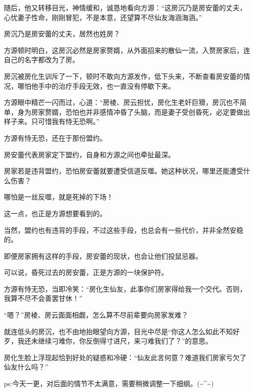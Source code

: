 \begin{this_body}
随后，他又转移目光，神情缓和，诚恳地看向方源：“这房沉乃是房安蕾的丈夫，心忧妻子性命，刚刚冒犯，不是本意，还望算不尽仙友海涵海涵。”

房沉乃是房安蕾的丈夫，居然也姓房？

方源顿时明白，这房沉必然是房家赘婿，从外面招来的散仙一流，入赘房家后，连自己的名字都改为了房。

房沉被房化生训斥了一下，顿时不敢向方源发作，低下头来，不断查看房安蕾的情况，哪怕他手中的治疗手段无效，也一直没有停歇下来。

方源眼中精芒一闪而过，心道：“房棱、房云担忧，房化生老奸巨猾，房沉也不简单，身为房家赘婿，恐怕也并非感情冲昏了头脑，而是妻子受创昏死，必定要做出样子来。只可惜我有恃无恐啊。”

方源有恃无恐，还在于那份盟约。

房安蕾代表房家定下盟约，自身和方源之间也牵扯最深。

房家若是违背盟约，恐怕房安蕾就要遭受信道反噬。她这种状况，哪里还能遭受什么伤害？

哪怕是一丝反噬，就是死掉的下场！

这一点，也正是方源想要看到的。

当然，盟约也有违背的手段，不过这些手段，也总会有一些代价，并非全然安稳的。

即便房家拥有这样的手段，房安蕾的现状，也会让他们投鼠忌器。

可以说，昏死过去的房安蕾，正是方源的一块保护符。

方源有恃无恐，当即冷笑：“房化生仙友，此事你们房家得给我一个交代。否则，我算不尽不会善罢甘休！”

“嗯？”房棱、房云面面相觑，怎么算不尽前辈要向房家发难？

就连低头的房沉，也不由地抬眼望向方源，目光中尽是“你这人怎么如此不知好歹，我还未继续刁难你，你反倒得寸进尺，来刁难我们了？”的意思。

房化生脸上浮现起恰到好处的疑惑和冷硬：“仙友此言何意？难道我们房家亏欠了仙友什么吗？”

ps:今天一更，对后面的情节不太满意，需要稍微调整一下细纲。(\~{}\^{}\~{})

\end{this_body}

